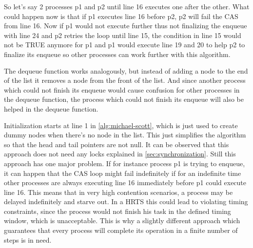 So let's say 2 processes p1 and p2 until line 16 executes one after the other. What could happen now is that if p1 executes line 16 before p2, p2 will fail the \ac{CAS} from line 16. Now if p1 would not execute further thus not finalizing the enqueue with line 24 and p2 retries the loop until line 15, the condition in line 15 would not be TRUE anymore for p1 and p1 would execute line 19 and 20 to help p2 to finalize its enqueue so other processes can work further with this algorithm. \cite{MichaelScottQueue}

The dequeue function works analogously, but instead of adding a node to the end of the list it removes a node from the front of the list. And since another process which could not finish its enqueue would cause confusion for other processes in the dequeue function, the process which could not finish its enqueue will also be helped in the dequeue function. \cite{MichaelScottQueue}

Initialization starts at line 1 in \cref{alg:michael-scott}, which is just used to create dummy nodes when there's no node in the list. This just simplifies the algorithm so that the head and tail pointers are not null. It can be observed that this approach does not need any locks explained in \cref{sec:synchronization}. Still this approach has one major problem. If for instance process p1 is trying to enqueue, it can happen that the \ac{CAS} loop might fail indefinitely if for an indefinite time other processes are always executing line 16 immediately before p1 could execute line 16. This means that in very high contention scenarios, a process may be delayed indefinitely and starve out. In a \ac{HRTS} this could lead to violating timing constraints, since the process would not finish his task in the defined timing window, which is unacceptable. This is why a slightly different approach which guarantees that every process will complete its operation in a finite number of steps is in need. \cite{MichaelScottQueue}

